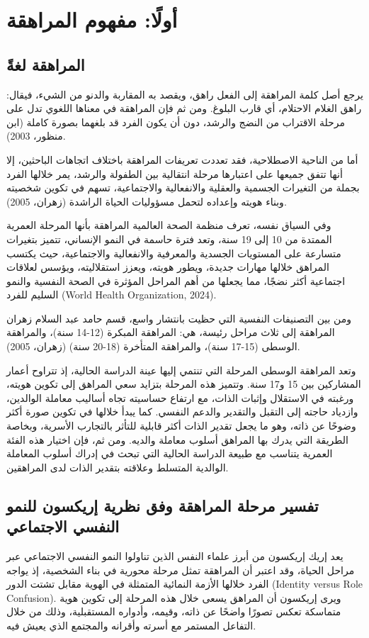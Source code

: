 \documentclass[12pt,oneside]{report}
\begin{document}
\section{أولًا: مفهوم المراهقة}
\subsection{المراهقة لغةً}
يرجع أصل كلمة المراهقة إلى الفعل راهق، ويقصد به المقاربة والدنو من الشيء، فيقال: راهق الغلام الاحتلام، أي قارب البلوغ. ومن ثم فإن المراهقة في معناها اللغوي تدل على مرحلة الاقتراب من النضج والرشد، دون أن يكون الفرد قد بلغهما بصورة كاملة (ابن منظور، 2003).

أما من الناحية الاصطلاحية، فقد تعددت تعريفات المراهقة باختلاف اتجاهات الباحثين، إلا أنها تتفق جميعها على اعتبارها مرحلة انتقالية بين الطفولة والرشد، يمر خلالها الفرد بجملة من التغيرات الجسمية والعقلية والانفعالية والاجتماعية، تسهم في تكوين شخصيته وبناء هويته وإعداده لتحمل مسؤوليات الحياة الراشدة (زهران، 2005).

وفي السياق نفسه، تعرف منظمة الصحة العالمية المراهقة بأنها المرحلة العمرية الممتدة من 10 إلى 19 سنة، وتعد فترة حاسمة في النمو الإنساني، تتميز بتغيرات متسارعة على المستويات الجسدية والمعرفية والانفعالية والاجتماعية، حيث يكتسب المراهق خلالها مهارات جديدة، ويطور هويته، ويعزز استقلاليته، ويؤسس لعلاقات اجتماعية أكثر نضجًا، مما يجعلها من أهم المراحل المؤثرة في الصحة النفسية والنمو السليم للفرد (World Health Organization, 2024).

ومن بين التصنيفات النفسية التي حظيت بانتشار واسع، قسم حامد عبد السلام زهران المراهقة إلى ثلاث مراحل رئيسة، هي: المراهقة المبكرة (12-14 سنة)، والمراهقة الوسطى (15-17 سنة)، والمراهقة المتأخرة (18-20 سنة) (زهران، 2005).

وتعد المراهقة الوسطى المرحلة التي تنتمي إليها عينة الدراسة الحالية، إذ تتراوح أعمار المشاركين بين 15 و17 سنة. وتتميز هذه المرحلة بتزايد سعي المراهق إلى تكوين هويته، ورغبته في الاستقلال وإثبات الذات، مع ارتفاع حساسيته تجاه أساليب معاملة الوالدين، وازدياد حاجته إلى التقبل والتقدير والدعم النفسي. كما يبدأ خلالها في تكوين صورة أكثر وضوحًا عن ذاته، وهو ما يجعل تقدير الذات أكثر قابلية للتأثر بالتجارب الأسرية، وبخاصة الطريقة التي يدرك بها المراهق أسلوب معاملة والديه. ومن ثم، فإن اختيار هذه الفئة العمرية يتناسب مع طبيعة الدراسة الحالية التي تبحث في إدراك أسلوب المعاملة الوالدية المتسلط وعلاقته بتقدير الذات لدى المراهقين.

\subsection{تفسير مرحلة المراهقة وفق نظرية إريكسون للنمو النفسي الاجتماعي}
يعد إريك إريكسون من أبرز علماء النفس الذين تناولوا النمو النفسي الاجتماعي عبر مراحل الحياة، وقد اعتبر أن المراهقة تمثل مرحلة محورية في بناء الشخصية، إذ يواجه الفرد خلالها الأزمة النمائية المتمثلة في الهوية مقابل تشتت الدور (Identity versus Role Confusion).  ويرى إريكسون أن المراهق يسعى خلال هذه المرحلة إلى تكوين هوية متماسكة تعكس تصورًا واضحًا عن ذاته، وقيمه، وأدواره المستقبلية، وذلك من خلال التفاعل المستمر مع أسرته وأقرانه والمجتمع الذي يعيش فيه.
\end{document}
